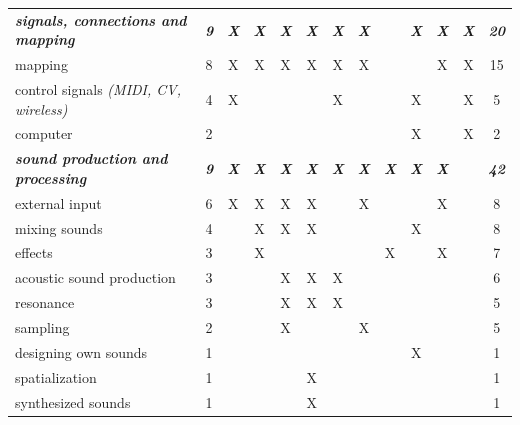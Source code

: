 \documentclass[letterpaper, 12pt]{article}
\begin{document}
\begin{spacing}{1.1}
\begin{longtable}{L{5.3cm}cccccccccccc}
        \emph{\textbf{signals, connections and mapping}} & \emph{\textbf{9}} & \emph{\textbf{X}} & \emph{\textbf{X}} & \emph{\textbf{X}} & \emph{\textbf{X}} & \emph{\textbf{X}} & \emph{\textbf{X}} & & \emph{\textbf{X}} & \emph{\textbf{X}} & \emph{\textbf{X}} & \emph{\textbf{20}} \\
        mapping                          & 8  & X & X & X & X & X & X &   &   & X & X & 15 \\
        control signals \emph{(MIDI, CV, wireless)} & 4  & X &   &   &   & X &   &   & X &   & X & 5  \\ 
        computer                         & 2  &   &   &   &   &   &   &   & X &   & X & 2  \\
        \hline
        \emph{\textbf{sound production and processing}} & \emph{\textbf{9}} & \emph{\textbf{X}} & \emph{\textbf{X}}    & \emph{\textbf{X}} & \emph{\textbf{X}} & \emph{\textbf{X}} & \emph{\textbf    {X}} & \emph{\textbf{X}} & \emph{\textbf{X}} & \emph{\textbf{X}} & & \emph  {\textbf{42}} \\
        external input                   & 6  & X & X & X & X &   & X &   &   & X &   & 8  \\
        mixing sounds                    & 4  &   & X & X & X &   &   &   & X &   &   & 8  \\
        effects                          & 3  &   & X &   &   &   &   & X &   & X &   & 7  \\
        acoustic sound production        & 3  &   &   & X & X & X &   &   &   &   &   & 6  \\
        resonance                        & 3  &   &   & X & X & X &   &   &   &   &   & 5  \\
        sampling                         & 2  &   &   & X &   &   & X &   &   &   &   & 5  \\
        designing own sounds             & 1  &   &   &   &   &   &   &   & X &   &   & 1  \\
        spatialization                   & 1  &   &   &   & X &   &   &   &   &   &   & 1  \\
        synthesized sounds               & 1  &   &   &   & X &   &   &   &   &   &   & 1  \\
        \hline
        

\end{longtable}
\end{spacing}
\end{document}
